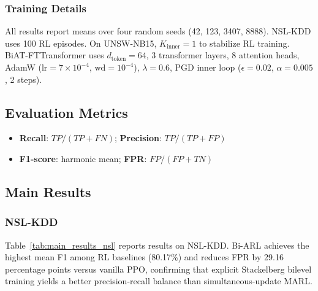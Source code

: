 \subsubsection{Training Details}

All results report means over four random seeds (42, 123, 3407, 8888). NSL-KDD uses 100 RL episodes. On UNSW-NB15, $K_{\text{inner}} = 1$ to stabilize RL training. BiAT-FTTransformer uses $d_{\text{token}} = 64$, 3 transformer layers, 8 attention heads, AdamW ($\text{lr} = 7 \times 10^{-4}$, $\text{wd} = 10^{-4}$), $\lambda = 0.6$, PGD inner loop ($\epsilon = 0.02$, $\alpha = 0.005$, 2 steps).

\subsection{Evaluation Metrics}

\begin{itemize}
    \item \textbf{Recall}: $TP/(TP+FN)$; \textbf{Precision}: $TP/(TP+FP)$
    \item \textbf{F1-score}: harmonic mean; \textbf{FPR}: $FP/(FP+TN)$
\end{itemize}

\subsection{Main Results}

\subsubsection{NSL-KDD}

Table~\ref{tab:main_results_nsl} reports results on NSL-KDD. Bi-ARL achieves the highest mean F1 among RL baselines (80.17\%) and reduces FPR by 29.16 percentage points versus vanilla PPO, confirming that explicit Stackelberg bilevel training yields a better precision-recall balance than simultaneous-update MARL.

